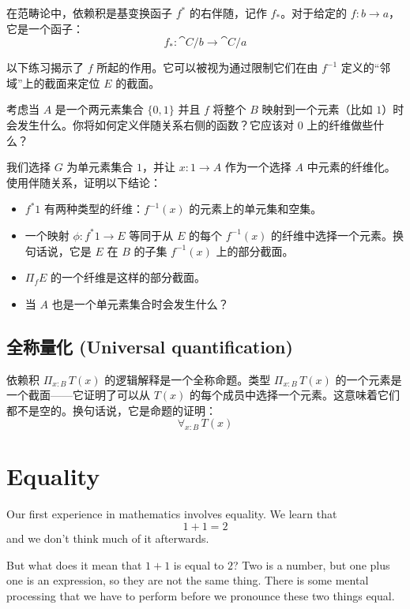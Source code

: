 \documentclass[DaoFP]{subfiles}
\begin{document}
  在范畴论中，依赖积是基变换函子 $f^*$ 的右伴随，记作 $f_*$。对于给定的 $f \colon b \to a$，它是一个函子：
  \[ f_* \colon \cat C/b \to \cat C/a \]

  以下练习揭示了 $f$ 所起的作用。它可以被视为通过限制它们在由 $f^{-1}$ 定义的“邻域”上的截面来定位 $E$ 的截面。

  \begin{exercise}
   考虑当 $A$ 是一个两元素集合 $\{0, 1\}$ 并且 $f$ 将整个 $B$ 映射到一个元素（比如 $1$）时会发生什么。你将如何定义伴随关系右侧的函数？它应该对 $0$ 上的纤维做些什么？
  \end{exercise}

  \begin{exercise}
   我们选择 $G$ 为单元素集合 $1$，并让 $x \colon 1 \to A$ 作为一个选择 $A$ 中元素的纤维化。使用伴随关系，证明以下结论：
   \begin{itemize}
    \item $f^* 1$ 有两种类型的纤维：$f^{-1} (x)$ 的元素上的单元集和空集。
    \item 一个映射 $\phi \colon f^* 1 \to E$ 等同于从 $E$ 的每个 $f^{-1}(x)$ 的纤维中选择一个元素。换句话说，它是 $E$ 在 $B$ 的子集 $f^{-1}(x)$ 上的部分截面。
    \item $\Pi_f E$ 的一个纤维是这样的部分截面。
    \item 当 $A$ 也是一个单元素集合时会发生什么？
   \end{itemize}
  \end{exercise}



  \subsection{全称量化 (Universal quantification)}

  依赖积 $\Pi_{x : B} \, T(x)$ 的逻辑解释是一个全称命题。类型 $\Pi_{x : B} \, T(x)$ 的一个元素是一个截面——它证明了可以从 $T(x)$ 的每个成员中选择一个元素。这意味着它们都不是空的。换句话说，它是命题的证明：
  \[ \forall_{x : B}\, T(x) \]

\section{Equality}

Our first experience in mathematics involves equality. We learn that 
\[1+1=2\] 
and we don't think much of it afterwards. 

But what does it mean that $1+1$ is equal to $2$? Two is a number, but one plus one is an expression, so they are not the same thing. There is some mental processing that we have to perform before we pronounce these two things equal. 
\end{document}
